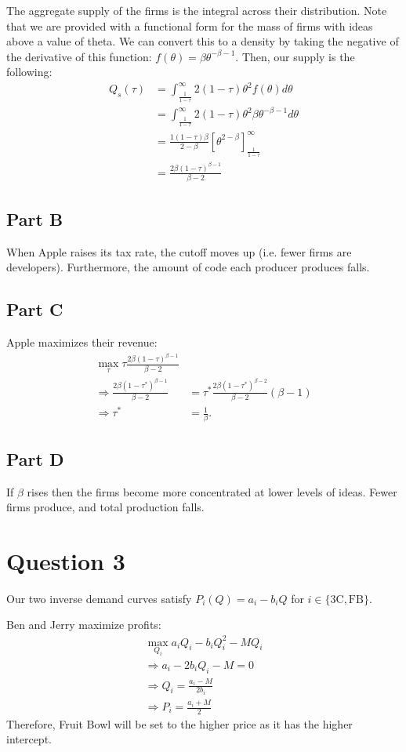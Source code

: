 \documentclass[11pt]{article} %
\begin{document}
The aggregate supply of the firms is the integral across their distribution. Note that we are provided with a functional form for the mass of firms with ideas above a value of theta. We can convert this to a density by taking the negative of the derivative of this function: $f(\theta) = \beta \theta^{-\beta - 1}$. Then, our supply is the following:
\begin{align*}
Q_s(\tau) &= \int_{\frac{1}{1-\tau}}^{\infty}2(1-\tau)\theta^2 f(\theta)d\theta\\
&=  \int_{\frac{1}{1-\tau}}^{\infty}2(1-\tau)\theta^2\beta \theta^{-\beta - 1}d\theta \\
&= \frac{1(1-\tau) \beta}{2-\beta}[\theta^{2-\beta}]_{\frac{1}{1-\tau}}^{\infty}\\
&= \frac{2\beta(1-\tau)^{\beta - 1}}{\beta - 2}
\end{align*}
\subsection{Part B}
When Apple raises its tax rate, the cutoff moves up (i.e. fewer firms are developers). Furthermore, the amount of code each producer produces falls.
\subsection{Part C}
Apple maximizes their revenue:
\begin{align*}
\max_{\tau} \tau  \frac{2\beta(1-\tau)^{\beta - 1}}{\beta - 2}\\
\Rightarrow \frac{2\beta(1-\tau^*)^{\beta - 1}}{\beta - 2} &= \tau^{*}\frac{2\beta(1-\tau^*)^{\beta - 2}}{\beta - 2}(\beta - 1)\\
\Rightarrow \tau^{*} &= \frac{1}{\beta}.
\end{align*}
\subsection{Part D}
If $\beta$ rises then the firms become more concentrated at lower levels of ideas. Fewer firms produce, and total production falls.
\section{Question 3}
Our two inverse demand curves satisfy $P_{i}(Q) = a_i - b_i Q$ for $i \in \{ \text{3C}, \text{FB} \}$.

Ben and Jerry maximize profits:
\begin{align*}
\max_{Q_{i}} a_i Q_i - b_i Q_i^2 - M Q_i\\
\Rightarrow a_i -2 b_i Q_i - M = 0\\
\Rightarrow Q_i = \frac{a_i - M}{2 b_i}\\
\Rightarrow P_i = \frac{a_i + M}{2}
\end{align*}
Therefore, Fruit Bowl will be set to the higher price as it has the higher intercept.
\end{document}
